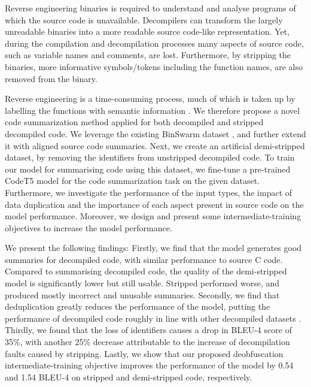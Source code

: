 Reverse engineering binaries is required to understand and analyse programs of which the source code is unavailable. Decompilers can transform the largely unreadable binaries into a more readable source code-like representation. Yet, during the compilation and decompilation processes many aspects of source code, such as variable names and comments, are lost. Furthermore, by stripping the binaries, more informative symbols/tokens including the function names, are also removed from the binary.


Reverse engineering is a time-consuming process, much of which is taken up by labelling the functions with semantic information \cite{reverseEngineerProcess}. We therefore propose a novel code summarization method applied for both decompiled and stripped decompiled code. We leverage the existing BinSwarm dataset \cite{InlinedFunc}, and further extend it with aligned source code summaries. Next, we create an artificial demi-stripped dataset, by removing the identifiers from unstripped decompiled code. To train our model for summarising code using this dataset, we fine-tune a pre-trained CodeT5 model for the code summarization task on the given dataset. Furthermore, we investigate the performance of the input types, the impact of data duplication and the importance of each aspect present in source code on the model performance. Moreover, we design and present some intermediate-training objectives to increase the model performance.

We present the following findings: 
Firstly, we find that the model generates good summaries for decompiled code, with similar performance to source C code. Compared to summarising decompiled code, the quality of the demi-stripped model is significantly lower but still usable. Stripped performed worse, and produced mostly incorrect and unusable summaries. 
Secondly, we find that deduplication greatly reduces the performance of the model, putting the performance of decompiled code roughly in line with other decompiled datasets \cite{CodeT5}. Thirdly, we found that the loss of identifiers causes a drop in BLEU-4 score of 35\%, with another 25\% decrease attributable to the increase of decompilation faults caused by stripping. Lastly, we show that our proposed deobfuscation intermediate-training objective improves the performance of the model by 0.54 and 1.54  BLEU-4 on stripped and demi-stripped code, respectively.